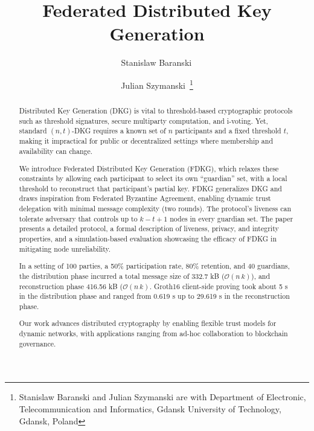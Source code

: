 \documentclass[lettersize,journal]{IEEEtran}
\theoremstyle{definition}
\begin{document}
\title{Federated Distributed Key Generation}


\author{Stanislaw Baranski\,     
    \and
    Julian Szymanski\,
    \thanks{Stanislaw Baranski and Julian Szymanski are with Department of Electronic, Telecommunication and Informatics, Gdansk University of Technology, Gdansk, 
Poland}
}
    

\date{}
\maketitle
\begin{abstract}
    Distributed Key Generation (DKG) is vital to threshold-based cryptographic protocols such as threshold signatures, secure multiparty computation, and i-voting. Yet, standard \((n,t)\)-DKG requires a known set of \(n\) participants and a fixed threshold \(t\), making it impractical for public or decentralized settings where membership and availability can change.

    We introduce Federated Distributed Key Generation (FDKG), which relaxes these constraints by allowing each participant to select its own “guardian” set, with a local threshold to reconstruct that participant’s partial key. FDKG generalizes DKG and draws inspiration from Federated Byzantine Agreement, enabling dynamic trust delegation with minimal message complexity (two rounds). The protocol's liveness can tolerate adversary that controls up to $k - t + 1$ nodes in every guardian set. The paper presents a detailed protocol, a formal description of liveness, privacy, and integrity properties, and a simulation-based evaluation showcasing the efficacy of FDKG in mitigating node unreliability.

    In a setting of 100 parties, a 50\% participation rate, 80\% retention, and 40 guardians, the distribution phase incurred a total message size of 332.7 kB ($\mathcal{O}(n\,k)$), and reconstruction phase 416.56 kB ($\mathcal{O}(n\,k)$. Groth16 client-side proving took about 5 s in the distribution phase and ranged from 0.619 s up to 29.619 s in the reconstruction phase. 
    
    Our work advances distributed cryptography by enabling flexible trust models for dynamic networks, with applications ranging from ad-hoc collaboration to blockchain governance.
\end{abstract}
\end{document}
